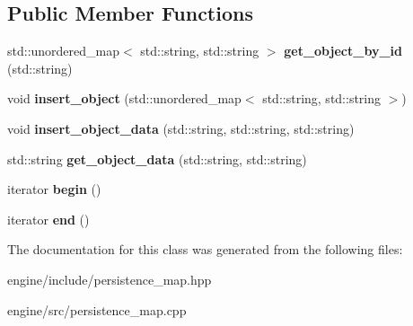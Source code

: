 \subsection*{Public Member Functions}
\begin{DoxyCompactItemize}
\item 
std\+::unordered\+\_\+map$<$ std\+::string, std\+::string $>$ {\bfseries get\+\_\+object\+\_\+by\+\_\+id} (std\+::string)\hypertarget{classengine_1_1_persistence_map_a2384a770ad55e71db81e3a9736e3bcd9}{}\label{classengine_1_1_persistence_map_a2384a770ad55e71db81e3a9736e3bcd9}

\item 
void {\bfseries insert\+\_\+object} (std\+::unordered\+\_\+map$<$ std\+::string, std\+::string $>$)\hypertarget{classengine_1_1_persistence_map_af7ab5be461caff60a22523ed2d9d91d8}{}\label{classengine_1_1_persistence_map_af7ab5be461caff60a22523ed2d9d91d8}

\item 
void {\bfseries insert\+\_\+object\+\_\+data} (std\+::string, std\+::string, std\+::string)\hypertarget{classengine_1_1_persistence_map_a3a0b83db916b9488ebdf1be39db15c6e}{}\label{classengine_1_1_persistence_map_a3a0b83db916b9488ebdf1be39db15c6e}

\item 
std\+::string {\bfseries get\+\_\+object\+\_\+data} (std\+::string, std\+::string)\hypertarget{classengine_1_1_persistence_map_a49b1c1a07503bb93ce7ca5fb4ebc92ee}{}\label{classengine_1_1_persistence_map_a49b1c1a07503bb93ce7ca5fb4ebc92ee}

\item 
iterator {\bfseries begin} ()\hypertarget{classengine_1_1_persistence_map_a5471e31f0aee2f59f51680365ac318d4}{}\label{classengine_1_1_persistence_map_a5471e31f0aee2f59f51680365ac318d4}

\item 
iterator {\bfseries end} ()\hypertarget{classengine_1_1_persistence_map_a4bd8c7b1bbf4938fc54d9b933d19af4e}{}\label{classengine_1_1_persistence_map_a4bd8c7b1bbf4938fc54d9b933d19af4e}

\end{DoxyCompactItemize}


The documentation for this class was generated from the following files\+:\begin{DoxyCompactItemize}
\item 
engine/include/persistence\+\_\+map.\+hpp\item 
engine/src/persistence\+\_\+map.\+cpp\end{DoxyCompactItemize}
